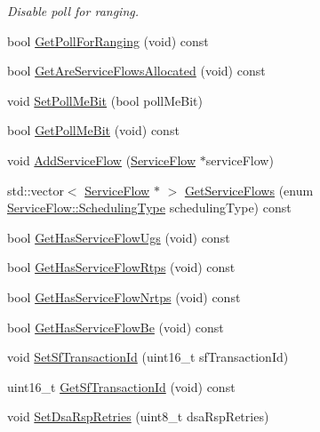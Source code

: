 \begin{DoxyCompactItemize}
\begin{DoxyCompactList}\small\item\em Disable poll for ranging. \end{DoxyCompactList}\item 
bool \hyperlink{classns3_1_1SSRecord_ace9eeaefb52f52c31708a6faae2c1e7c}{Get\+Poll\+For\+Ranging} (void) const 
\item 
bool \hyperlink{classns3_1_1SSRecord_a5816f13259d65f620e9de31851ed2865}{Get\+Are\+Service\+Flows\+Allocated} (void) const 
\item 
void \hyperlink{classns3_1_1SSRecord_a1522a1751c1ced218b0f8eb47bd3bd1d}{Set\+Poll\+Me\+Bit} (bool poll\+Me\+Bit)
\item 
bool \hyperlink{classns3_1_1SSRecord_ab3aa272f0781dcc20ae49a8b21d7d17c}{Get\+Poll\+Me\+Bit} (void) const 
\item 
void \hyperlink{classns3_1_1SSRecord_a0f0bdc0ef9e2a271a03308b66958d4c2}{Add\+Service\+Flow} (\hyperlink{classns3_1_1ServiceFlow}{Service\+Flow} $\ast$service\+Flow)
\item 
std\+::vector$<$ \hyperlink{classns3_1_1ServiceFlow}{Service\+Flow} $\ast$ $>$ \hyperlink{classns3_1_1SSRecord_a7b2ed8b7cbad4dfcd65adde5699169c7}{Get\+Service\+Flows} (enum \hyperlink{classns3_1_1ServiceFlow_a7990ba10be1e098328fd1e6382a26235}{Service\+Flow\+::\+Scheduling\+Type} scheduling\+Type) const 
\item 
bool \hyperlink{classns3_1_1SSRecord_aab718d530d5badf4c687f4a162a36271}{Get\+Has\+Service\+Flow\+Ugs} (void) const 
\item 
bool \hyperlink{classns3_1_1SSRecord_a5add411068731bbb7b15af2e0cb35698}{Get\+Has\+Service\+Flow\+Rtps} (void) const 
\item 
bool \hyperlink{classns3_1_1SSRecord_a9326c69dc348f5744fbceede8325288c}{Get\+Has\+Service\+Flow\+Nrtps} (void) const 
\item 
bool \hyperlink{classns3_1_1SSRecord_a2ca9063ea507d24d7025b5b0d431f7ac}{Get\+Has\+Service\+Flow\+Be} (void) const 
\item 
void \hyperlink{classns3_1_1SSRecord_ad573f2767ae348f58aede77aba80c22b}{Set\+Sf\+Transaction\+Id} (uint16\+\_\+t sf\+Transaction\+Id)
\item 
uint16\+\_\+t \hyperlink{classns3_1_1SSRecord_a43251c851451656fa241dea83568b075}{Get\+Sf\+Transaction\+Id} (void) const 
\item 
void \hyperlink{classns3_1_1SSRecord_a0eae85d8baafacbd5fa0a526e07db81f}{Set\+Dsa\+Rsp\+Retries} (uint8\+\_\+t dsa\+Rsp\+Retries)
\item 

\end{DoxyCompactItemize}

